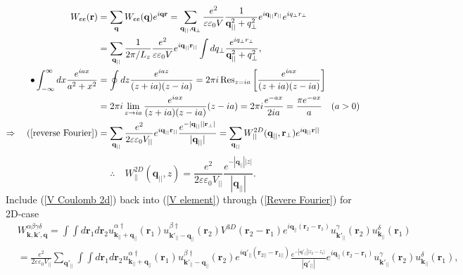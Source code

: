 \documentclass[12pt,english,a4paper]{article}
\newcommand{\dg}{\dagger}
\begin{document}
\begin{appendices}
\begin{align}
	\label{reverse Fourier}
	W_{ee} (\textbf{r}) &= \sum_{\textbf{q}}W_{ee}(\textbf{q}) e^{i\textbf{q}\textbf{r}} = \sum_{\textbf{q}_{||},\textbf{q}_{\perp}} \frac{e^2}{\varepsilon \varepsilon_0 V} \frac{1}{\textbf{q}_{||}^2 +q_{\perp}^2} e^{i\textbf{q}_{||}\textbf{r}_{||}} e^{iq_{\perp} r_{\perp}} \nonumber \\
	&= \sum_{\textbf{q}_{||}}\frac{1}{2\pi/L_z}\frac{e^2}{\varepsilon \varepsilon_0 V} e^{i\textbf{q}_{||} \textbf{r}_{||}} \int dq_{\perp}\frac{e^{iq_{\perp}r_{\perp}}}{\textbf{q}_{||}^2 +q_{\perp}^2}, \\ \bullet
	\int_{-\infty}^{\infty} dx \frac{e^{iax}}{a^2 +x^2} &= \oint dz \frac{e^{iaz}}{(z+ia)(z - ia)} = 2\pi i\Res_{z=ia}\bigg[\frac{e^{iax}}{(z+ia)(z - ia)}\bigg] \nonumber\\
	&= 2\pi i \lim_{z \to ia}\frac{e^{iax}}{(z+ia)(z - ia)} (z-ia) = 2\pi i \frac{e^{-ax}}{2ia} = \frac{\pi e^{-ax}}{a} \quad (a > 0)\\ \label{Revere Fourier}
	 \Rightarrow \quad 
	(\ref{reverse Fourier}) &= \sum_{\textbf{q}_{||}} \frac{e^2}{2 \varepsilon \varepsilon_0 V_{||} }e^{i\textbf{q}_{||} \textbf{r}_{||}} \frac{e^{-|\textbf{q}_{||}||\textbf{r}_{\perp}|}}{|\textbf{q}_{||}|} = \sum_{\textbf{q}_{||}}W^{2D}_{||}(\textbf{q}_{||}, \textbf{r}_\perp) e^{i\textbf{q}_{||}\textbf{r}{||}}
\end{align}
\begin{equation}
	\label{V Coulomb 2d}
	\therefore \quad W^{2D}_{||}(\textbf{q}_{||}, z) = \frac{e^2}{2 \varepsilon \varepsilon_0 V_{||} }\frac{e^{- |\textbf{q}_{||}| |z|}}{|\textbf{q}_{||}|}.
\end{equation}
\quad Include (\ref{V Coulomb 2d}) back into (\ref{V element}) through (\ref{Revere Fourier}) for 2D-case
\begin{align}
	&W^{\alpha\beta\gamma \delta}_{\textbf{k},\textbf{k'},\textbf{q}}= \int \int d\textbf{r}_1 d\textbf{r}_2 u_{\textbf{k}_{||}+\textbf{q}_{||}}^{\alpha\dg}(\textbf{r}_1) u ^{\beta \dg}_{\textbf{k}'_{||}-\textbf{q}_{||}}(\textbf{r}_2) V^{3D}(\textbf{r}_2 - \textbf{r}_1) e^{i\textbf{q}_{||}(\textbf{r}_2 - \textbf{r}_1)} u^\gamma_{\textbf{k}'_{||}}(\textbf{r}_2) u^{\delta}_{\textbf{k}_{||}}(\textbf{r}_1)\\
	&=\frac{e^2}{2 \varepsilon \varepsilon_0 V_{||}}\sum_{\textbf{q}'_{||}}\int \int d\textbf{r}_1 d\textbf{r}_2 u_{\textbf{k}_{||}+\textbf{q}_{||}}^{\alpha\dg}(\textbf{r}_1) u ^{\beta \dg}_{\textbf{k}'_{||}-\textbf{q}_{||}}(\textbf{r}_2)e^{i\textbf{q}'_{||} (\textbf{r}_{2||} - \textbf{r}_{1||})}\frac{e^{-|\textbf{q}'_{||}||z_2-z_1|}}{|\textbf{q}'_{||}|} e^{i\textbf{q}_{||}(\textbf{r}_2 - \textbf{r}_1)} u^\gamma_{\textbf{k}'_{||}}(\textbf{r}_2) u^{\delta}_{\textbf{k}_{||}}(\textbf{r}_1)\nonumber,

\end{align}
\end{appendices}
\end{document}
